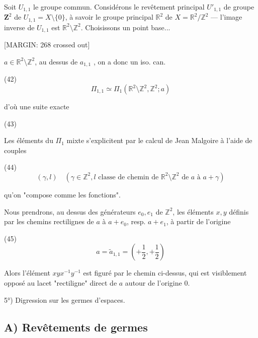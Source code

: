 Soit $U_{1,1}$ le groupe commun. Considérons le revêtement principal $U'_{1,1}$ de groupe $\mathbf{Z}^2$ de $U_{1,1} = X \setminus \{0\}$, à savoir le groupe principal $\mathbb{R}^2$ de $X = \mathbb{R}^2 / \mathbb{Z}^2$ --- l'image inverse de $U_{1,1}$ est $\mathbb{R}^2 \setminus \mathbb{Z}^2$.
Choisissons un point base...

\newpage


[MARGIN: 268 crossed out]

$a \in \mathbb{R}^2 \setminus \mathbb{Z}^2$,
au dessus de $a_{1,1}$ , on a donc un iso. can.

(42) $$ \Pi_{1,1} \simeq \Pi_1(\mathbb{R}^2 \setminus \mathbb{Z}^2, \mathbb{Z}^2; a) $$

d'où une suite exacte

(43)

Les éléments du $\Pi_1$ mixte s'explicitent par le calcul de Jean Malgoire à l'aide de couples

(44) $$ (\gamma, l) \quad (\gamma \in \mathbb{Z}^2, l \text{ classe de chemin de } \mathbb{R}^2 \setminus \mathbb{Z}^2 \text{ de } a \text{ à } a+\gamma) $$

qu'on "compose comme les fonctions".

Nous prendrons, au dessus des générateurs $e_0, e_1$ de $\mathbb{Z}^2$, les éléments $x, y$ définis par les chemins rectilignes de $a$ à $a+e_0$, resp. $a+e_1$, à partir de l'origine

(45) $$ a = \tilde{a}_{1,1} = (+\frac{1}{2}, +\frac{1}{2}) $$

Alors l'élément $xyx^{-1}y^{-1}$ est figuré par le chemin ci-dessus, qui est visiblement opposé au lacet "rectiligne" direct de $a$ autour de l'origine $0$.

\newpage


5°) Digression sur les germes d'espaces.

\subsection*{A) Revêtements de germes}
\label{sec:rev-germes}

